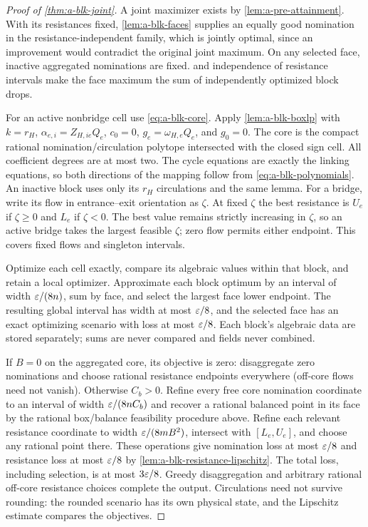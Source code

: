 \begin{proof}[Proof of \cref{thm:a-blk-joint}]
A joint maximizer exists by \cref{lem:a-pre-attainment}. With its
resistances fixed, \cref{lem:a-blk-faces} supplies an equally good
nomination in the resistance-independent family, which is jointly
optimal, since an improvement would contradict the original joint
maximum.
On any selected face, inactive aggregated nominations are fixed.
 and independence of resistance intervals make
the face maximum the sum of independently optimized block drops.

For an active nonbridge cell use \cref{eq:a-blk-core}. Apply
\cref{lem:a-blk-boxlp} with $k=r_H$, $\alpha_{e,i}=Z_{H,ie}Q_e$,
$c_0=0$, $g_e=\omega_{H,e} Q_e$, and $g_0=0$. The core is the compact
rational nomination/circulation polytope intersected with the closed
sign cell. All coefficient degrees are at most two. The cycle equations
are exactly the linking equations, so both directions of the mapping
follow from \cref{eq:a-blk-polynomials}. An inactive block uses only
its $r_H$ circulations and the same lemma. For a bridge, write its
flow in entrance--exit orientation as $\zeta$. At fixed $\zeta$ the
best resistance is $U_e$ if $\zeta\ge0$ and $L_e$ if $\zeta<0$.
The best value remains strictly increasing in $\zeta$, so an active
bridge takes the largest feasible $\zeta$; zero flow permits either
endpoint. This covers fixed flows and singleton intervals.

Optimize each cell exactly, compare its algebraic values within that
block, and retain a local optimizer. Approximate each block optimum by
an interval of width $\varepsilon/(8n)$, sum by face, and select the largest
face lower endpoint. The resulting global interval has width at most
$\varepsilon/8$, and the selected face has an exact optimizing scenario with
loss at most $\varepsilon/8$. Each block's algebraic data are stored
separately; sums are never compared and fields never combined.

If $B=0$ on the aggregated core, its objective is zero: disaggregate
zero nominations and choose rational resistance endpoints everywhere
(off-core flows need not vanish). Otherwise $C_b>0$. Refine every free
core nomination coordinate to an interval of width
$\varepsilon/(8nC_b)$ and recover a rational balanced point in its face by
the rational box/balance feasibility procedure above. Refine each
relevant resistance coordinate to width $\varepsilon/(8mB^2)$, intersect with
$[L_e,U_e]$, and choose any rational point there. These operations give
nomination loss at most $\varepsilon/8$ and resistance loss at most $\varepsilon/8$
by \cref{lem:a-blk-resistance-lipschitz}. The total loss, including
selection, is at most $3\varepsilon/8$. Greedy disaggregation and arbitrary
rational off-core resistance choices complete the output. Circulations
need not survive rounding: the rounded scenario has its own physical
state, and the Lipschitz estimate compares the objectives.


\end{proof}
